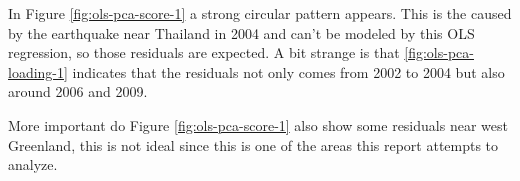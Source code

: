 In Figure \ref{fig:ols-pca-score-1} a strong circular pattern appears. This is the caused by the earthquake near Thailand in 2004 and can't be modeled by this OLS regression, so those residuals are expected. A bit strange is that \ref{fig:ols-pca-loading-1} indicates that the residuals not only comes from 2002 to 2004 but also around 2006 and 2009.

More important do Figure \ref{fig:ols-pca-score-1} also show some residuals near west Greenland, this is not ideal since this is one of the areas this report attempts to analyze.
